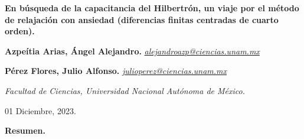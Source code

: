 \documentclass[a4paper,11pt]{extarticle} %
\newcommand{\ut}
[1]{\textbf{#1}} %
\begin{document}
\begin{center}


	\large{\textbf{En búsqueda de la capacitancia del Hilbertrón, un viaje por el método de relajación con ansiedad (diferencias finitas 
         centradas de cuarto orden).}}

	\vspace{-\baselineskip}

	\vspace{0.45em}

	\begin{multicols}{2}
		\begin{center}
                \small{\noindent \textbf {Azpeítia Arias, Ángel Alejandro.}\linebreak
				\noindent \textit{\href{mailto:alejandroazp@ciencias.unam.mx}{alejandroazp@ciencias.unam.mx}}}
		
		\end{center}
		\columnbreak
		\begin{center}
                \small{\noindent \textbf{ Pérez Flores, Julio Alfonso.}\linebreak
				\noindent \textit{\href{mailto:julio_ perez@ciencias.unam.mx}{julio\textunderscore perez@ciencias.unam.mx}}}
	
		\end{center}
	\end{multicols}

	\vspace{-\baselineskip}
	\vspace{0.35em}

	\textit{\small{Facultad de Ciencias, Universidad Nacional Autónoma de México. }}

	\small{01 Diciembre, 2023.}

\end{center}

{\noindent \Large\ut{Resumen.}}
\end{document}
